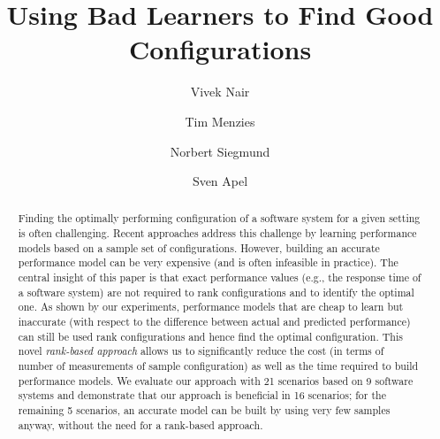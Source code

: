 \documentclass[sigconf]{acmart}
\begin{document}
%
\title{Using Bad Learners to Find Good Configurations}



\author{Vivek Nair}

\author{Tim Menzies}

\author{Norbert Siegmund}

\author{Sven Apel}






\begin{abstract}

 Finding the optimally performing configuration of a software system for a given setting is often challenging. Recent approaches address this challenge by learning performance models based on a sample set of configurations.
 However, building an accurate performance model can be very expensive (and is often infeasible in practice). 
The central  insight of this paper is that   
exact performance values (e.g., the response time of a software system) are not required to rank  configurations and to identify the optimal one. 
As shown by our experiments, performance models that are cheap to learn but inaccurate (with respect to the difference between actual and predicted performance) can still be used rank configurations and hence find the optimal configuration. This novel \emph{rank-based approach} allows us to significantly reduce the cost (in terms of number of measurements of sample configuration) as well as the time required to build performance models. We evaluate our approach with 21 scenarios based on 9 software systems and demonstrate that our approach is beneficial in 16 scenarios; for the remaining 5 scenarios, an accurate model can be built by using very few samples anyway, without the need for a rank-based approach.
\end{abstract}
\end{document}
